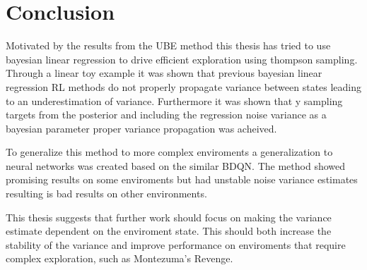 
\chapter{Conclusion}\label{ch:conc}

Motivated by the results from the UBE method\citep{donoghue_2017} this thesis has tried to use bayesian linear regression to drive efficient exploration using thompson sampling. Through a linear toy example it was shown that previous bayesian linear regression RL methods do not properly propagate variance between states leading to an underestimation of variance. Furthermore  it was shown that y sampling targets from the posterior and including the regression noise variance as a bayesian parameter proper variance propagation was acheived.

To generalize this method to more complex enviroments a generalization to neural networks was created based on the similar \cite{azziz_2018} BDQN. The method showed promising results on some enviroments but had unstable noise variance estimates resulting is bad results on other environments.

This thesis suggests that further work should focus on making the variance estimate dependent on the enviroment state. This should both increase the stability of the variance and improve performance on enviroments that require complex exploration, such as Montezuma's Revenge.

\cleardoublepage